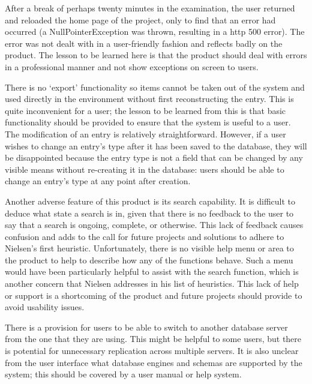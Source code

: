 After a break of perhaps twenty minutes in the examination, the user returned and reloaded the home page of the project, only to find that an error had occurred (a NullPointerException was thrown, resulting in a \gls{http} 500 error).  The error was not dealt with in a user-friendly fashion and reflects badly on the product.  The lesson to be learned here is that the product should deal with errors in a professional manner and not show exceptions on screen to users.

There is no `export' functionality so items cannot be taken out of the system and used directly in the \bibtex{} environment without first reconstructing the entry.  This is quite inconvenient for a user; the lesson to be learned from this is that basic functionality should be provided to ensure that the system is useful to a user.
The modification of an entry is relatively straightforward.  However, if a user wishes to change an entry's type after it has been saved to the database, they will be disappointed because the entry type is not a field that can be changed by any visible means without re-creating it in the database: users should be able to change an entry's type at any point after creation.

Another adverse feature of this product is its search capability.  It is difficult to deduce what state a search is in, given that there is no feedback to the user to say that a search is ongoing, complete, or otherwise.  This lack of feedback causes confusion and adds to the call for future projects and solutions to adhere to Nielsen's first heuristic. Unfortunately, there is no visible help menu or area to the product to help to describe how any of the functions behave. Such a menu would have been particularly helpful to assist with the search function, which is another concern that Nielsen addresses in his list of heuristics.  This lack of help or support is a shortcoming of the product and future projects should provide to avoid usability issues.

There is a provision for users to be able to switch to another database server from the one that they are using.  This might be helpful to some users, but there is potential for unnecessary replication across multiple servers.  It is also unclear from the user interface what database engines and schemas are supported by the system; this should be covered by a user manual or help system.

